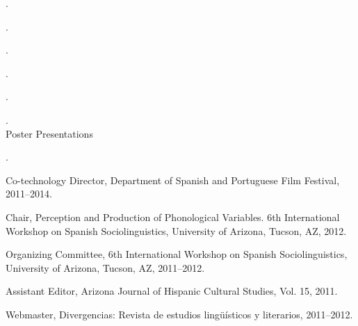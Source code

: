 \documentclass[11pt]{article}
\begin{document}
\noindent {}. \\ \vspace{-0.1in}

\noindent {}. \\ \vspace{-0.1in}

\noindent {}. \\ \vspace{-0.1in}

\noindent {}. \\ \vspace{-0.1in}

\noindent {}. \\ \vspace{-0.1in}

\noindent {}. \\ 


\ind Poster Presentations \\ \vspace{-0.1in}

\noindent {}.
 

\bigskip 
 

\medskip
\noindent Co-technology Director, Department of Spanish and Portuguese Film Festival, 2011--2014. \\ \vspace{-0.1in}

\noindent Chair, Perception and Production of Phonological Variables. 6th International Workshop on Spanish Sociolinguistics, University of Arizona, Tucson, AZ, 2012. \\ \vspace{-0.1in}

\noindent Organizing Committee, 6th International Workshop on Spanish Sociolinguistics, University of Arizona, Tucson, AZ, 2011--2012.  \\ \vspace{-0.1in}

\noindent Assistant Editor, Arizona Journal of Hispanic Cultural Studies, Vol. 15, 2011. \\ \vspace{-0.1in}

\noindent Webmaster, Divergencias: Revista de estudios lingüísticos y literarios, 2011--2012. \\ \vspace{-0.1in}
\end{document}
